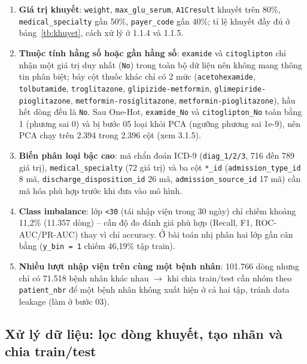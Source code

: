 \documentclass[a4paper]{report}
\begin{document}
\begin{enumerate}
  \item \textbf{Giá trị khuyết}: \texttt{weight}, \texttt{max\_\allowbreak{}glu\_\allowbreak{}serum}, \texttt{A1Cresult} khuyết trên 80\%, \texttt{medical\_\allowbreak{}specialty} gần 50\%, \texttt{payer\_\allowbreak{}code} gần 40\%; tỉ lệ khuyết đầy đủ ở bảng~\ref{tb:khuyet}, cách xử lý ở 1.1.4 và 1.1.5.
  \item \textbf{Thuộc tính hằng số hoặc gần hằng số}: \texttt{examide} và \texttt{citoglipton} chỉ nhận một giá trị duy nhất (\texttt{No}) trong toàn bộ dữ liệu nên không mang thông tin phân biệt; bảy cột thuốc khác chỉ có 2 mức (\texttt{acetohexamide}, \texttt{tolbutamide}, \texttt{troglitazone}, \texttt{glipizide-\allowbreak{}metformin}, \texttt{glimepiride-\allowbreak{}pioglitazone}, \texttt{metformin-\allowbreak{}rosiglitazone}, \texttt{metformin-\allowbreak{}pioglitazone}), hầu hết dòng đều là \texttt{No}. Sau One-Hot, \texttt{examide\_\allowbreak{}No} và \texttt{citoglipton\_\allowbreak{}No} toàn bằng 1 (phương sai 0) và bị bước 05 loại khỏi PCA (ngưỡng phương sai 1e-9), nên PCA chạy trên 2.394 trong 2.396 cột (xem 3.1.5).
  \item \textbf{Biến phân loại bậc cao}: mã chẩn đoán ICD-9 (\texttt{diag\_\allowbreak{}1/\allowbreak{}2/\allowbreak{}3}, 716 đến 789 giá trị), \texttt{medical\_\allowbreak{}specialty} (72 giá trị) và ba cột \texttt{*\_\allowbreak{}id} (\texttt{admission\_\allowbreak{}type\_\allowbreak{}id} 8 mã, \texttt{discharge\_\allowbreak{}disposition\_\allowbreak{}id} 26 mã, \texttt{admission\_\allowbreak{}source\_\allowbreak{}id} 17 mã) cần mã hóa phù hợp trước khi đưa vào mô hình.
  \item \textbf{Class imbalance}: lớp \texttt{<30} (tái nhập viện trong 30 ngày) chỉ chiếm khoảng 11,2\% (11.357 dòng) – cần độ đo đánh giá phù hợp (Recall, F1, ROC-AUC/PR-AUC) thay vì chỉ accuracy. Ở bài toán nhị phân hai lớp gần cân bằng (\texttt{y\_\allowbreak{}bin = 1} chiếm 46,19\% tập train).
  \item \textbf{Nhiều lượt nhập viện trên cùng một bệnh nhân}: 101.766 dòng nhưng chỉ có 71.518 bệnh nhân khác nhau $\rightarrow$ khi chia train/test cần nhóm theo \texttt{patient\_\allowbreak{}nbr} để một bệnh nhân không xuất hiện ở cả hai tập, tránh data leakage (làm ở bước 03).
\end{enumerate}

\subsection{Xử lý dữ liệu: lọc dòng khuyết, tạo nhãn và chia train/test}
\end{document}
